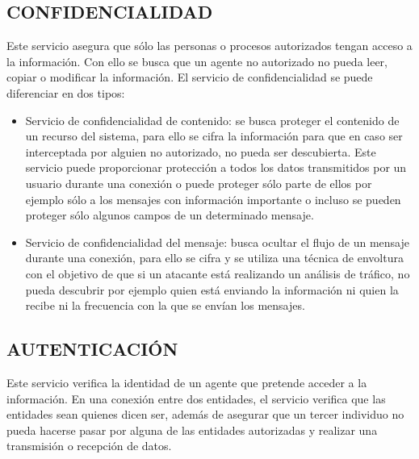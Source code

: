 \subsection{CONFIDENCIALIDAD}
Este servicio asegura que sólo las personas o procesos autorizados tengan acceso a la información. Con ello se busca que un agente no autorizado no pueda leer, copiar o modificar la información.
El servicio de confidencialidad se puede diferenciar en dos tipos:
\begin{itemize}
	\item Servicio de confidencialidad de contenido: se busca proteger el contenido de un recurso del sistema, para ello se cifra la información para que en caso ser interceptada por alguien no autorizado, no pueda ser descubierta. Este servicio puede proporcionar protección a todos los datos transmitidos por un usuario durante una conexión o puede proteger sólo parte de ellos por ejemplo sólo a los mensajes con información importante o incluso se pueden proteger sólo algunos campos de un determinado mensaje.
	\item Servicio de confidencialidad del mensaje: busca ocultar el flujo de un mensaje durante una conexión, para ello se cifra y se utiliza una técnica de envoltura con el objetivo de que si un atacante está realizando un análisis de tráfico, no pueda descubrir por ejemplo quien está enviando la información ni quien la recibe ni la frecuencia con la que se envían los mensajes.
\end{itemize}

\subsection{AUTENTICACIÓN}
Este servicio verifica la identidad de un agente que pretende acceder a la información. En una conexión entre dos entidades, el servicio verifica que las entidades sean quienes dicen ser, además de asegurar que un tercer individuo no pueda hacerse pasar por alguna de las entidades autorizadas y realizar una transmisión o recepción de datos.

